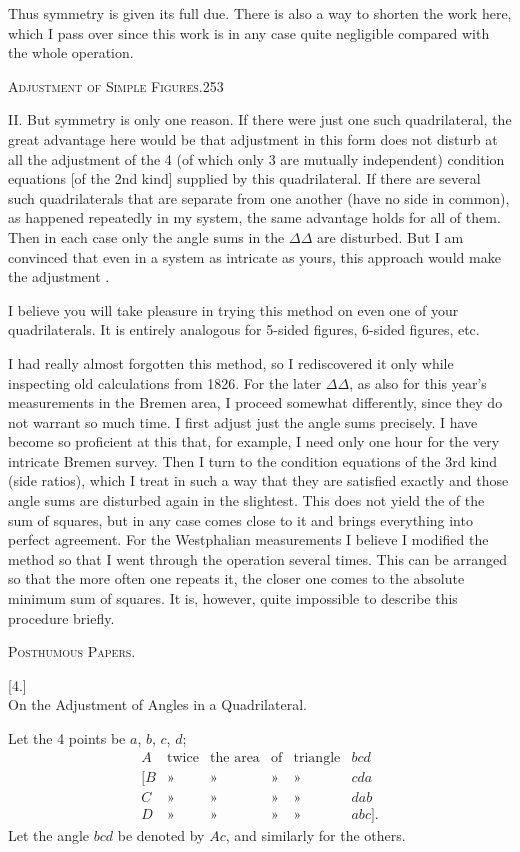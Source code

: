 Thus symmetry is given its full due. There is also a way to shorten the work here, which I pass over since this work is in any case quite negligible compared with the whole operation.

\clearpage
\noindent\mbox{}\hfill\textsc{Adjustment of Simple Figures.}\hfill253\par\medskip
II. But symmetry is only one reason. If there were just one such quadrilateral, the great advantage here would be that adjustment in this form does not disturb at all the adjustment of the 4 (of which only 3 are mutually independent) condition equations [of the 2nd kind] supplied by this quadrilateral. If there are several such quadrilaterals that are separate from one another (have no side in common), as happened repeatedly in my system, the same advantage holds for all of them. Then in each case only the angle sums in the  $\Delta\Delta$ are disturbed. But I am convinced that even in a system as intricate as yours, this approach would make the adjustment .

I believe you will take pleasure in trying this method on even one of your quadrilaterals. It is entirely analogous for 5-sided figures, 6-sided figures, etc.

I had really almost forgotten this method, so I rediscovered it only while inspecting old calculations from 1826. For the later $\Delta\Delta$, as also for this year's measurements in the Bremen area, I proceed somewhat differently, since they do not warrant so much time. I first adjust just the angle sums precisely. I have become so proficient at this that, for example, I need only one hour for the very intricate Bremen survey. Then I turn to the condition equations of the 3rd kind (side ratios), which I treat in such a way that they are satisfied exactly and those angle sums are  disturbed again in the slightest. This does not yield the  of the sum of squares, but in any case comes close to it and brings everything into perfect agreement. For the Westphalian measurements I believe I modified the method so that I went through the operation several times. This can be arranged so that the more often one repeats it, the closer one comes to the absolute minimum sum of squares. It is, however, quite impossible to describe this procedure briefly.

\clearpage
{}\hfill\textsc{Posthumous Papers.}\hfill\mbox{}\par\medskip
\begin{center}[4.]\\[5pt]On the Adjustment of Angles in a Quadrilateral.\end{center}
Let the 4 points be $a$, $b$, $c$, $d$;
\[
\begin{array}{rlllll}
A&\text{twice}&\text{the area}&\text{of}&\text{triangle}&bcd\\
{[}B&\text{»}&\text{»}&\text{»}&\text{»}&cda\\
C&\text{»}&\text{»}&\text{»}&\text{»}&dab\\
D&\text{»}&\text{»}&\text{»}&\text{»}&abc].
\end{array}
\]
Let the angle $bcd$ be denoted by $Ac$, and similarly for the others.

